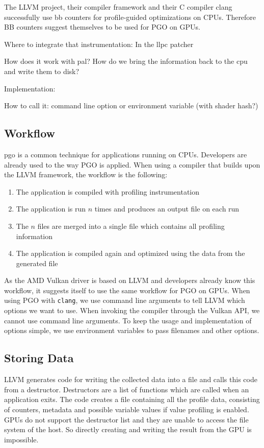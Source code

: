 \clearpage
{}
The LLVM project, their compiler framework and their C compiler clang successfully use \gls{bb} counters for profile-guided optimizations on CPUs. Therefore BB counters suggest themselves to be used for PGO on GPUs.

Where to integrate that instrumentation: In the llpc patcher

How does it work with pal?
How do we bring the information back to the cpu and write them to disk?

Implementation:

How to call it: command line option or environment variable (with shader hash?)

\subsection{Workflow}
\label{sub:workflow}
\Gls{pgo} is a common technique for applications running on CPUs.
Developers are already used to the way PGO is applied.
When using a compiler that builds upon the LLVM framework, the workflow is the following:
\begin{enumerate}
	\item The application is compiled with profiling instrumentation
	\item The application is run $n$ times and produces an output file on each run
	\item The $n$ files are merged into a single file which contains all profiling information
	\item The application is compiled again and optimized using the data from the generated file
\end{enumerate}
As the AMD Vulkan driver is based on LLVM and developers already know this workflow, it suggests itself to use the same workflow for PGO on GPUs.
When using PGO with \texttt{clang}, we use command line arguments to tell LLVM which options we want to use. When invoking the compiler through the Vulkan API, we cannot use command line arguments.
To keep the usage and implementation of options simple, we use environment variables to pass filenames and other options.

\subsection{Storing Data}
\label{sub:save-design}
LLVM generates code for writing the collected data into a file and calls this code from a destructor.
Destructors are a list of functions which are called when an application exits.
The code creates a file containing all the profile data, consisting of counters, metadata and possible variable values if value profiling is enabled.
GPUs do not support the destructor list and they are unable to access the file system of the host.
So directly creating and writing the result from the GPU is impossible.

